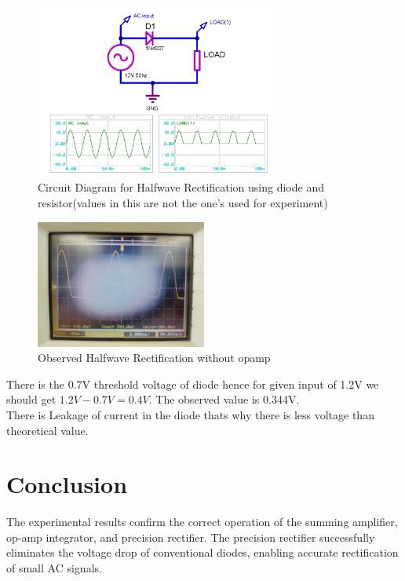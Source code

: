 \documentclass[a4paper,12pt]{article}
\begin{document}
\begin{figure}[H]
    \centering
    \includegraphics[width=0.7\textwidth]{figs/diode.png}
    \caption{Circuit Diagram for Halfwave Rectification using diode and resistor(values in this are not the one's used for experiment)}
\end{figure}
\begin{figure}[H]
    \centering
    \includegraphics[width=0.5\textwidth]{figs/halfwave_diode.png}
    \caption{Observed Halfwave Rectification without opamp}
\end{figure}
There is the 0.7V threshold voltage of diode hence for given input of 1.2V we should get $1.2V - 0.7V = 0.4V$. The observed value is 0.344V.\\
There is Leakage of current in the diode thats why there is less voltage than theoretical value.

\section{Conclusion}
The experimental results confirm the correct operation of the summing amplifier, op-amp integrator, and precision rectifier. The precision rectifier successfully eliminates the voltage drop of conventional diodes, enabling accurate rectification of small AC signals.
\end{document}
